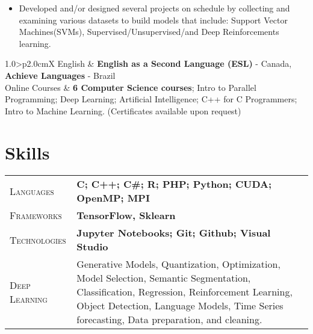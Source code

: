 \documentclass[9pt, a4paper, oneside, final]{scrartcl} %
\newcommand{\gray}{\rowcolor[gray]{.90}} %
\begin{document}
\begin{itemize}
\item Developed and/or designed several projects on schedule by collecting and examining various datasets to build models that include: Support Vector Machines(SVMs), Supervised/Unsupervised/and Deep Reinforcements learning.
\end{itemize}

\begin{center}
\begin{tabularx}{1.0\linewidth}{>{\raggedleft\scshape}p{2.0cm}X}
\gray English & \textbf{English as a Second Language (ESL)} - Canada, 
          \textbf{Achieve Languages} - Brazil\\
\gray Online Courses & \textbf{6 Computer Science courses}; Intro to Parallel Programming; Deep Learning; Artificial Intelligence; C++ for C Programmers; Intro to Machine Learning. (Certificates available upon request)
\end{tabularx}
\end{center}


\section{Skills}

\begin{center}
\begin{tabularx}{1.0\linewidth}{>{\raggedleft\scshape}p{2.2cm}X}
\gray Languages & \textbf{C; C++; C\#; R; PHP; Python; CUDA; OpenMP; MPI}\\ %
\gray Frameworks & \textbf{TensorFlow, Sklearn}\\ %
\gray Technologies & \textbf{Jupyter Notebooks; Git; Github; Visual Studio}\\
\gray Deep Learning & Generative Models, Quantization, Optimization, Model Selection, Semantic Segmentation, Classification, Regression, Reinforcement Learning, Object Detection, Language Models, Time Series forecasting, Data preparation, and cleaning.
\end{tabularx}
\end{center}

\end{document}
